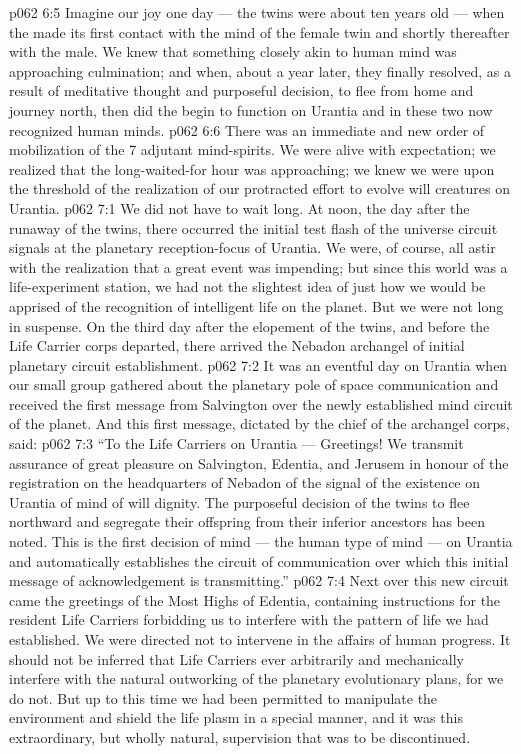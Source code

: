\vs p062 6:5 Imagine our joy one day --- the twins were about ten years old --- when the  made its first contact with the mind of the female twin and shortly thereafter with the male. We knew that something closely akin to human mind was approaching culmination; and when, about a year later, they finally resolved, as a result of meditative thought and purposeful decision, to flee from home and journey north, then did the  begin to function on Urantia and in these two now recognized human minds.
\vs p062 6:6 There was an immediate and new order of mobilization of the 7 adjutant mind\hyp{}spirits. We were alive with expectation; we realized that the long\hyp{}waited\hyp{}for hour was approaching; we knew we were upon the threshold of the realization of our protracted effort to evolve will creatures on Urantia.
\vs p062 7:1 We did not have to wait long. At noon, the day after the runaway of the twins, there occurred the initial test flash of the universe circuit signals at the planetary reception\hyp{}focus of Urantia. We were, of course, all astir with the realization that a great event was impending; but since this world was a life\hyp{}experiment station, we had not the slightest idea of just how we would be apprised of the recognition of intelligent life on the planet. But we were not long in suspense. On the third day after the elopement of the twins, and before the Life Carrier corps departed, there arrived the Nebadon archangel of initial planetary circuit establishment.
\vs p062 7:2 It was an eventful day on Urantia when our small group gathered about the planetary pole of space communication and received the first message from Salvington over the newly established mind circuit of the planet. And this first message, dictated by the chief of the archangel corps, said:
\vs p062 7:3 “To the Life Carriers on Urantia --- Greetings! We transmit assurance of great pleasure on Salvington, Edentia, and Jerusem in honour of the registration on the headquarters of Nebadon of the signal of the existence on Urantia of mind of will dignity. The purposeful decision of the twins to flee northward and segregate their offspring from their inferior ancestors has been noted. This is the first decision of mind --- the human type of mind --- on Urantia and automatically establishes the circuit of communication over which this initial message of acknowledgement is transmitting.”
\vs p062 7:4 Next over this new circuit came the greetings of the Most Highs of Edentia, containing instructions for the resident Life Carriers forbidding us to interfere with the pattern of life we had established. We were directed not to intervene in the affairs of human progress. It should not be inferred that Life Carriers ever arbitrarily and mechanically interfere with the natural outworking of the planetary evolutionary plans, for we do not. But up to this time we had been permitted to manipulate the environment and shield the life plasm in a special manner, and it was this extraordinary, but wholly natural, supervision that was to be discontinued.
